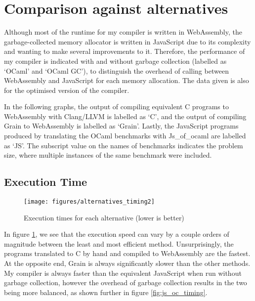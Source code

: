

\section{Comparison against alternatives}
Although most of the runtime for my compiler is written in WebAssembly, the garbage-collected memory allocator is written in JavaScript due to its complexity and wanting to make several improvements to it. Therefore, the performance of my compiler is indicated with and without garbage collection (labelled as `OCaml' and `OCaml GC'), to distinguish the overhead of calling between WebAssembly and JavaScript for each memory allocation. The data given is also for the optimised version of the compiler.

In the following graphs, the output of compiling equivalent C programs to WebAssembly with Clang/LLVM is labelled as `C', and the output of compiling Grain to WebAssembly is labelled as `Grain'. Lastly, the JavaScript programs produced by translating the OCaml benchmarks with Js\_of\_ocaml are labelled as `JS'. The subscript value on the names of benchmarks indicates the problem size, where multiple instances of the same benchmark were included.

\subsection{Execution Time}

\begin{figure}[H]
\hspace{-0.7cm}
\texttt{[image: figures/alternatives\_timing2]}
\vspace{-0.5cm}
\caption{Execution times for each alternative (lower is better)}
 \label{fig:alt_timing} 
\end{figure}

In figure \ref{fig:alt_timing}, we see that the execution speed can vary by a couple orders of magnitude between the least and most efficient method. Unsurprisingly, the programs translated to C by hand and compiled to WebAssembly are the fastest. At the opposite end, Grain is always significantly slower than the other methods. My compiler is always faster than the equivalent JavaScript when run without garbage collection, however the overhead of garbage collection results in the two being more balanced, as shown further in figure \ref{fig:js_oc_timing}.%


